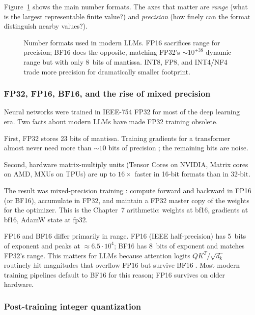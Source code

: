 Figure~\ref{fig:quantization-precision} shows the main number
formats. The axes that matter are \emph{range} (what is the largest
representable finite value?) and \emph{precision} (how finely can
the format distinguish nearby values?).

\begin{figure}[ht]
  \centering
  
  \caption{Number formats used in modern LLMs. FP16 sacrifices range
  for precision; BF16 does the opposite, matching FP32's
  $\sim 10^{\pm 38}$ dynamic range but with only 8~bits of mantissa.
  INT8, FP8, and INT4/NF4 trade more precision for dramatically
  smaller footprint.}
  \label{fig:quantization-precision}
\end{figure}

\subsubsection{FP32, FP16, BF16, and the rise of mixed precision}

Neural networks were trained in IEEE-754 FP32 for most of the deep
learning era. Two facts about modern LLMs have made FP32 training
obsolete.

First, FP32 stores 23 bits of mantissa. Training gradients for a
transformer almost never need more than $\sim 10$ bits of precision
\citep{micikevicius2018mixed}; the remaining bits are noise.

Second, hardware matrix-multiply units (Tensor Cores on NVIDIA,
Matrix cores on AMD, MXUs on TPUs) are up to $16\times$ faster in
16-bit formats than in 32-bit.

The result was mixed-precision training
\citep{micikevicius2018mixed}: compute forward and backward in FP16
(or BF16), accumulate in FP32, and maintain a FP32 master copy of the
weights for the optimizer. This is the Chapter~7 arithmetic: weights at
bf16, gradients at bf16, AdamW state at fp32.

FP16 and BF16 differ primarily in range. FP16 (IEEE half-precision)
has 5~bits of exponent and peaks at $\approx 6.5\cdot 10^4$; BF16
has 8~bits of exponent and matches FP32's range. This matters for
LLMs because attention logits $QK^T / \sqrt{d_k}$ routinely hit
magnitudes that overflow FP16 but survive BF16
\citep{kalamkar2019bfloat16}. Most modern training pipelines default
to BF16 for this reason; FP16 survives on older hardware.

\subsubsection{Post-training integer quantization}

